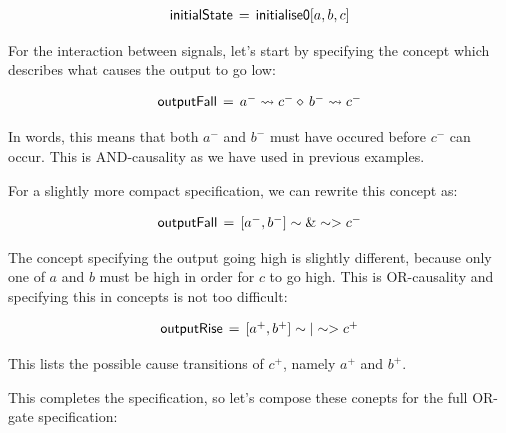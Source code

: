 \documentclass[british, journal]{IEEEtran}
\begin{document}
\[
\begin{array}{lcl}
\mathsf{initialState}&\hspace{-2mm}=&\hspace{-2mm}\mathsf{initialise0} [a, b, c]
\end{array}
\]

For the interaction between signals, let's start by specifying the concept which 
describes what causes the output to go low:

\[
\begin{array}{lcl}
\mathsf{outputFall}&\hspace{-2mm}=&\hspace{-2mm}a^{-} \rightsquigarrow c^{-} \diamond\, b^{-} \rightsquigarrow c^{-}
\end{array}
\]

In words, this means that both $a^{-}$ and $b^{-}$ must have occured before $c^{-}$ can occur. 
This is AND-causality as we have used in previous examples. 

For a slightly more compact specification, we can rewrite this concept as:

\[
\begin{array}{lcl}
\mathsf{outputFall}&\hspace{-2mm}=&\hspace{-2mm}[a^{-}, b^{-}] \sim\&\sim> c^{-} 
\end{array}
\]

The concept specifying the output going high is slightly different, because only one of
$a$ and $b$ must be high in order for $c$ to go high. This is OR-causality and specifying 
this in concepts is not too difficult: 
                                                                                                                                                                                                                                                                                                                                                        
\[
\begin{array}{lcl}
\mathsf{outputRise}&\hspace{-2mm}=&\hspace{-2mm}[a^{+}, b^{+}] \sim|\sim> c^{+} 
\end{array}
\]

This lists the possible cause transitions of $c^{+}$, namely $a^{+}$ and $b^{+}$. 

This completes the specification, so let's compose these conepts for the full OR-gate
specification:
\end{document}

